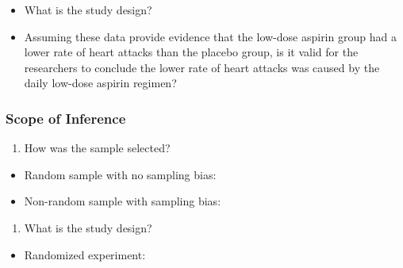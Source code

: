 \documentclass[
]{report}
\providecommand{\tightlist}{%
  \setlength{\itemsep}{0pt}\setlength{\parskip}{0pt}}
\begin{document}
\begin{itemize}
\tightlist
\item
  What is the study design?
\end{itemize}

\vspace{0.5in}

\begin{itemize}
\tightlist
\item
  Assuming these data provide evidence that the low-dose aspirin group had a lower rate of heart attacks than the placebo group, is it valid for the researchers to conclude the lower rate of heart attacks was caused by the daily low-dose aspirin regimen?
\end{itemize}

\vspace{0.5in}

\subsubsection*{Scope of Inference}\label{scope-of-inference}

\begin{enumerate}
\def\labelenumi{\arabic{enumi}.}
\tightlist
\item
  How was the sample selected?
\end{enumerate}

\begin{itemize}
\tightlist
\item
  Random sample with no sampling bias:
\end{itemize}

\vspace{0.35in}

\begin{itemize}
\tightlist
\item
  Non-random sample with sampling bias:
\end{itemize}

\vspace{0.35in}

\begin{enumerate}
\def\labelenumi{\arabic{enumi}.}
\setcounter{enumi}{1}
\tightlist
\item
  What is the study design?
\end{enumerate}

\begin{itemize}
\tightlist
\item
  Randomized experiment:
\end{itemize}
\end{document}
